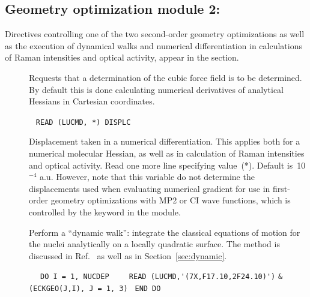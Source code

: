 \subsection{Geometry optimization module 2: }
\label{sec:abawalk}

Directives controlling one of the two second-order
geometry
optimizations  as well as the
execution of dynamical walks and numerical
differentiation in
calculations of Raman intensities and optical activity,
appear in the  section.

\begin{description}
\item[]
Requests that a determination of the cubic force field is to be determined.
By default this is done calculating numerical derivatives of analytical
Hessians in Cartesian coordinates.

\item[]\verb| |\newline
\verb|READ (LUCMD, *) DISPLC|

Displacement taken in a numerical differentiation. This applies both for a numerical molecular
Hessian, as well as in calculation of Raman
intensities and optical activity.
Read one more
line specifying value~(*).  Default is~10$^{-4}$ a.u. However,
note that this variable do not determine the displacements used
when evaluating numerical gradient for use in first-order geometry
optimizations with MP2 or CI wave
functions, which is controlled by the  keyword in the
 module.

\item[]
Perform a ``dynamic walk'': integrate the
classical equations of motion for the nuclei
analytically on a locally
quadratic surface. The method is discussed in
Ref.~\cite{theuhjajcpl173} as well as in Section~\ref{sec:dynamic}.

\item[]\verb| |\newline
\verb| DO I = 1, NUCDEP|\newline
\verb|    READ (LUCMD,'(7X,F17.10,2F24.10)')|\newline
\verb|&        (ECKGEO(J,I), J = 1, 3)|\newline
\verb| END DO|


\end{description}
